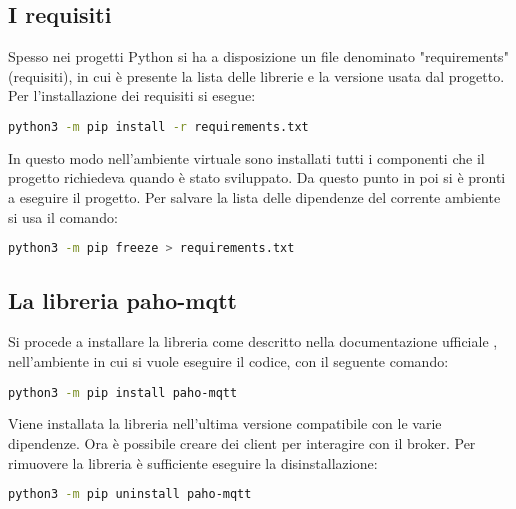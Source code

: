 \subsection{I requisiti}
\label{subsec:client-installazione-requisiti}
Spesso nei progetti Python si ha a disposizione un file denominato "requirements" (requisiti), 
in cui è presente la lista delle librerie e la versione usata dal progetto.
Per l'installazione dei requisiti si esegue:
\begin{lstlisting}[language=bash]
	python3 -m pip install -r requirements.txt
\end{lstlisting}
In questo modo nell'ambiente virtuale sono installati tutti i componenti 
che il progetto richiedeva quando è stato sviluppato.
Da questo punto in poi si è pronti a eseguire il progetto.\newline
Per salvare la lista delle dipendenze del corrente ambiente si usa il comando:
\begin{lstlisting}[language=bash]
	python3 -m pip freeze > requirements.txt
\end{lstlisting}

\subsection{La libreria paho-mqtt}
\label{subsec:client-installazione-libreria}
Si procede a installare la libreria come descritto nella documentazione ufficiale \cite{client-paho-doc-main},
nell'ambiente in cui si vuole eseguire il codice, con il seguente comando:
\begin{lstlisting}[language=bash]
	python3 -m pip install paho-mqtt
\end{lstlisting}
Viene installata la libreria nell'ultima versione compatibile con le varie dipendenze.
Ora è possibile creare dei client per interagire con il broker.\newline
Per rimuovere la libreria è sufficiente eseguire la disinstallazione: \label{python-rimuovere-libreria}
\begin{lstlisting}[language=bash]
	python3 -m pip uninstall paho-mqtt
\end{lstlisting}



